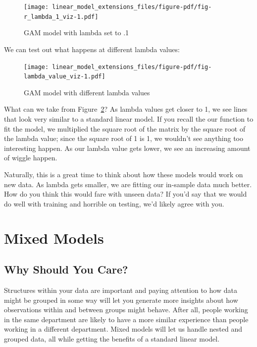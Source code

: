 \documentclass[
  letterpaper,
]{krantz}
\begin{document}
\begin{figure}

{\centering \texttt{[image: linear\_model\_extensions\_files/figure-pdf/fig-r\_lambda\_1\_viz-1.pdf]}

}

\caption{\label{fig-r_lambda_1_viz}GAM model with lambda set to .1}

\end{figure}

We can test out what happens at different lambda values:

\begin{figure}

{\centering \texttt{[image: linear\_model\_extensions\_files/figure-pdf/fig-lambda\_value\_viz-1.pdf]}

}

\caption{\label{fig-lambda_value_viz}GAM model with different lambda
values}

\end{figure}

What can we take from Figure~\ref{fig-lambda_value_viz}? As lambda
values get closer to 1, we see lines that look very similar to a
standard linear model. If you recall the our function to fit the model,
we multiplied the square root of the matrix by the square root of the
lambda value; since the square root of 1 is 1, we wouldn't see anything
too interesting happen. As our lambda value gets lower, we see an
increasing amount of wiggle happen.

Naturally, this is a great time to think about how these models would
work on new data. As lambda gets smaller, we are fitting our in-sample
data much better. How do you think this would fare with unseen data? If
you'd say that we would do well with training and horrible on testing,
we'd likely agree with you.

\section{Mixed Models}\label{mixed-models}

\subsection{Why Should You Care?}\label{why-should-you-care-4}

Structures within your data are important and paying attention to how
data might be grouped in some way will let you generate more insights
about how observations within and between groups might behave. After
all, people working in the same department are likely to have a more
similar experience than people working in a different department. Mixed
models will let us handle nested and grouped data, all while getting the
benefits of a standard linear model.
\end{document}
